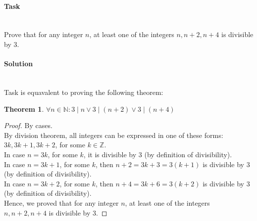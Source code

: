 \documentclass[11pt]{article}
\begin{document}
   \paragraph{Task}\mbox{} \\
      Prove that for any integer $n$, at least one of the integers $n, n + 2, n + 4$ is divisible by $3$.
   \paragraph{Solution}\mbox{} \\
   Task is equavalent to proving the following theorem:
   \newtheorem*{Theorem}{Theorem}
   \begin{Theorem}
       $\displaystyle \forall n \in \mathbb{N}: 3 \mid n \lor 3 \mid (n + 2) \lor 3 \mid (n + 4)$
   \end{Theorem}
   \begin{proof}
   By cases. \\
   By division theorem, all integers can be expressed in one of these forms: $3k, 3k + 1, 3k + 2$, for some $k \in \mathbb{Z}$. \\
   In case $n = 3k$, for some $k$, it is divisible by 3 (by definition of divisibility). \\
   In case $n = 3k + 1$, for some $k$, then $n + 2 = 3k + 3 = 3(k + 1)$ is divisible by 3 (by definition of divisibility). \\
   In case $n = 3k + 2$, for some $k$, then $n + 4 = 3k + 6 = 3(k + 2)$ is divisible by 3 (by definition of divisibility). \\
   Hence, we proved that for any integer $n$, at least one of the integers $n, n + 2, n + 4$ is divisible by $3$.
   \end{proof}
\end{document}
